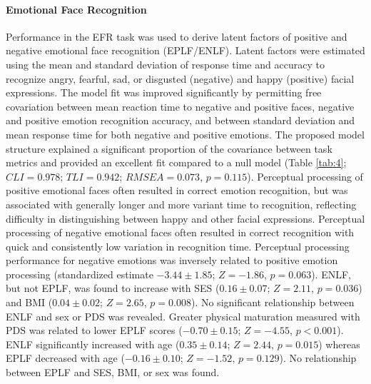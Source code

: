 \documentclass{article}%
\begin{document}
\paragraph*{Emotional Face Recognition} Performance in the EFR task was used to derive latent factors of positive and negative emotional face recognition (EPLF/ENLF). Latent factors were estimated using the mean and standard deviation of response time and accuracy to recognize angry, fearful, sad, or disgusted (negative) and happy (positive) facial expressions. The model fit was improved significantly by permitting free covariation between mean reaction time to negative and positive faces, negative and positive emotion recognition accuracy, and between standard deviation and mean response time for both negative and positive emotions. The proposed model structure explained a significant proportion of the covariance between task metrics and provided an excellent fit compared to a null model (Table \ref{tab:4}; $CLI = 0.978$; $TLI = 0.942$; $RMSEA = 0.073$, $p = 0.115$). Perceptual processing of positive emotional faces often resulted in correct emotion recognition, but was associated with generally longer and more variant time to recognition, reflecting difficulty in distinguishing between happy and other facial expressions. Perceptual processing of negative emotional faces often resulted in correct recognition with quick and consistently low variation in recognition time. Perceptual processing performance for negative emotions was inversely related to positive emotion processing (standardized estimate $-3.44\pm1.85$; $Z=-1.86$, $p = 0.063$). ENLF, but not EPLF, was found to increase with SES ($0.16\pm0.07$; $Z=2.11$, $p = 0.036$) and BMI ($0.04\pm0.02$; $Z=2.65$, $p=0.008$). No significant relationship between ENLF and sex or PDS was revealed. Greater physical maturation measured with PDS was related to lower EPLF scores ($-0.70\pm0.15$; $Z=-4.55$, $p<0.001$). ENLF significantly increased with age ($0.35\pm0.14$; $Z=2.44$, $p=0.015$) whereas EPLF decreased with age ($-0.16\pm0.10$; $Z=-1.52$, $p=0.129$). No relationship between EPLF and SES, BMI, or sex was found.
\end{document}
